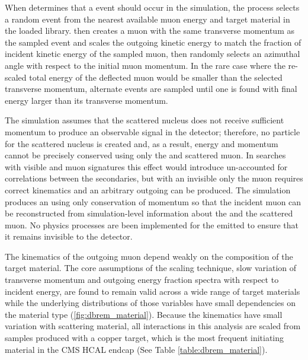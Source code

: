 When \gf determines that a \dbrem event should occur in the simulation, the process selects a random event from the nearest available muon energy and target material in the loaded \mg library. 
\gf then creates a muon with the same transverse momentum as the sampled event and scales the outgoing kinetic energy to match the fraction of incident kinetic energy of the sampled muon, then randomly selects an azimuthal angle with respect to the initial muon momentum. 
In the rare case where the re-scaled total energy of the deflected muon would be smaller than the selected transverse momentum, alternate events are sampled until one is found with final energy larger than its transverse momentum. 

The simulation assumes that the scattered nucleus does not receive sufficient momentum to produce an observable signal in the detector; therefore, no \gf particle for the scattered nucleus is created and, as a result, energy and momentum cannot be precisely conserved using only the \aprime and scattered muon. 
In searches with visible \aprime and muon signatures this effect would introduce un-accounted for correlations between the secondaries, but with an invisible \aprime only the muon requires correct kinematics and an arbitrary outgoing \aprime can be produced.  
The simulation produces an \aprime using only conservation of momentum so that the incident muon can be reconstructed from simulation-level information about the \aprime and the scattered muon.
No physics processes are been implemented for the emitted \aprime to ensure that it remains invisible to the detector.

The kinematics of the outgoing muon depend weakly on the composition of the target material.
The core assumptions of the scaling technique, slow variation of transverse momentum and outgoing energy fraction spectra with respect to incident energy, are found to remain valid across a wide range of target materials while the underlying distributions of those variables have small dependencies on the material type (\cref{fig:dbrem_material}).
Because the kinematics have small variation with scattering material, all \dbrem interactions in this analysis are scaled from samples produced with a copper target, which is the most frequent \dbrem initiating material in the CMS HCAL endcap (See Table \ref{table:dbrem_material}).

